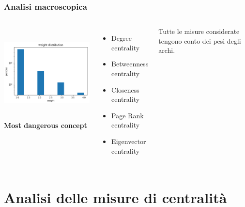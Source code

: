 \documentclass{beamer}
\begin{document}
\begin{frame}
\frametitle{Analisi macroscopica}
\begin{columns}
             \centering
             \includegraphics[height=5cm, width=5cm]{images/weight_d.png}
              \textbf{Most dangerous concept}\\ \begin{itemize}
                  \item Degree centrality
                  \item Betweenness centrality
                  \item Closeness centrality
                  \item Page Rank centrality
                  \item Eigenvector centrality
              \end{itemize}
              
             Tutte le misure considerate tengono conto dei pesi degli archi.
         \end{columns} 

\end{frame}


\section{Analisi delle misure di centralità}
\end{document}
